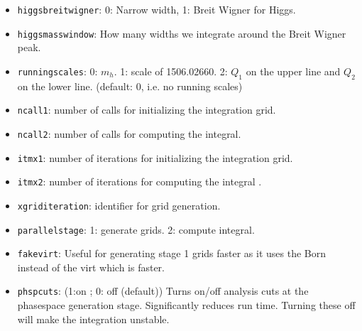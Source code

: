 \documentclass[12pt,a4]{article}
\begin{document}
\begin{itemize}
\item\texttt{higgsbreitwigner}: 0: Narrow width, 1: Breit Wigner for Higgs.
  
\item\texttt{higgsmasswindow}: How many widths we integrate around the
  Breit Wigner peak.
  
\item\texttt{runningscales}: 0: $m_h$. 1: scale of 1506.02660. 2: $Q_1$
  on the upper line and $Q_2$ on the lower line. (default: 0, i.e. no
  running scales)
                  
\item\texttt{ncall1}: number of calls for initializing the integration grid.
  
\item\texttt{ncall2}: number of calls for computing the integral.
  
\item\texttt{itmx1}: number of iterations for initializing the
  integration grid.
  
\item\texttt{itmx2}: number of iterations for computing the integral .
  
\item\texttt{xgriditeration}: identifier for grid generation.
  
\item\texttt{parallelstage}: 1: generate grids. 2: compute integral.

\item\texttt{fakevirt}: Useful for generating stage 1 grids faster as
  it uses the Born instead of the virt which is faster.

\item\texttt{phspcuts}: (1:on ; 0: off (default)) Turns on/off analysis
  cuts at the phasespace generation stage. Significantly reduces run
  time. Turning these off will make the integration unstable.
\end{itemize}
\end{document}
